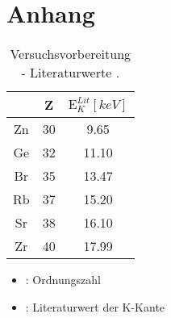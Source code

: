 \section{Anhang}

\begin{table}
    \begin{minipage}{.5\textwidth} 
        \caption{Versuchsvorbereitung - Literaturwerte \cite{Steffen}.}
        \centering
        \begin{tabular}{c c c}
            \toprule
                \mbox{} & Z & $\text{E}_K^{Lit} [\si{keV}]$  \\ %
            \midrule
                Zn & 30 & 9.65   \\
                Ge & 32 & 11.10  \\
                Br & 35 & 13.47  \\
                Rb & 37 & 15.20  \\
                Sr & 38 & 16.10  \\
                Zr & 40 & 17.99 \\
            \bottomrule    
        \end{tabular}
    \end{minipage}
\begin{minipage}{.5\textwidth}
    \begin{itemize}
    \item[]{: Ordnungszahl}
    \item[]{: Literaturwert der K-Kante}
    \end{itemize}
\end{minipage}
\end{table}

